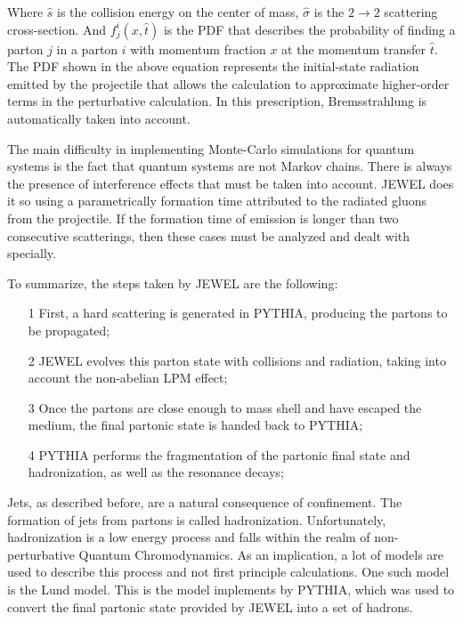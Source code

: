 Where $\hat{s}$ is the collision energy on the center of mass, $\hat{\sigma}$ is the $2 \rightarrow 2$ scattering cross-section. And $f_j^i(x,\hat{t})$ is the PDF that describes the probability of finding a parton $j$ in a parton $i$ with momentum fraction $x$ at the momentum transfer $\hat{t}$. The PDF shown in the above equation represents the initial-state radiation emitted by the projectile that allows the calculation to approximate higher-order terms in the perturbative calculation. In this prescription, Bremsstrahlung is automatically taken into account.
\par
The main difficulty in implementing Monte-Carlo simulations for quantum systems is the fact that quantum systems are not Markov chains. There is always the presence of interference effects that must be taken into account. JEWEL does it so using a parametrically formation time attributed to the radiated gluons from the projectile. If the formation time of emission is longer than two consecutive scatterings, then these cases must be analyzed and dealt with specially. 
\par
To summarize, the steps taken by JEWEL are the following:

\begin{itemize}
\item[1] First, a hard scattering is generated in PYTHIA, producing the partons to be propagated;
\item[2]JEWEL evolves this parton state with collisions and radiation, taking into account the non-abelian LPM effect;
\item[3]Once the partons are close enough to mass shell and have escaped the medium, the final partonic state is handed back to PYTHIA;
\item[4]PYTHIA performs the fragmentation of the partonic final state and hadronization, as well as the resonance decays;
\end{itemize}



Jets, as described before, are a natural consequence of confinement. The formation of jets from partons is called hadronization. Unfortunately, hadronization is a low energy process and falls within the realm of non-perturbative Quantum Chromodynamics. As an implication, a lot of models are used to describe this process and not first principle calculations. One such model is the Lund model. This is the model implements by PYTHIA, which was used to convert the final partonic state provided by JEWEL into a set of hadrons.

